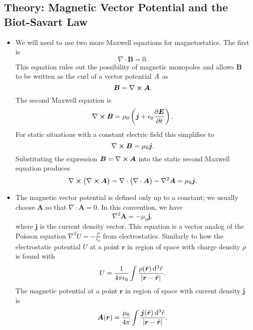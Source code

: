 \documentclass[11pt, a4paper]{article}
\newcommand{\diff}{\mathop{}\!\mathrm{d}} %
\renewcommand{\vec}[1]{\bm{#1}} %
\newcommand{\tvec}[1]{\tilde{\vec{#1}}} %
\renewcommand{\r}{\vec{r}}
\newcommand{\E}{\vec{E}}  %
\newcommand{\B}{\vec{B}}  %
\newcommand{\A}{\vec{A}}  %
\newcommand{\ee}{\epsilon_{0}}  %
\renewcommand{\div}{\nabla \cdot}
\renewcommand{\curl}{\nabla \cross}
\renewcommand{\laplacian}{\nabla^{2}}
\begin{document}
\subsection{Theory: Magnetic Vector Potential and the Biot-Savart Law}
\begin{itemize}
	\item We will need to use two more Maxwell equations for magnetostatics. The first is
	\begin{equation*}
		\div \B = 0.
	\end{equation*}
	This equation rules out the possibility of magnetic monopoles and allows $ \B $ to be written as the curl of a vector potential $ \\A $ as
	\begin{equation*}
		\B = \curl \A.
	\end{equation*}
	The second Maxwell equation is 
	\begin{equation*}
		\curl \B = \mu_{0}\left(\vec{j} + \ee \pdv{\E}{t}\right).
	\end{equation*}
	For static situations with a constant electric field this simplifies to
	\begin{equation*}
		\curl \B = \mu_{0}\vec{j}.
	\end{equation*}
	Substituting the expression $ \B = \curl \A $ into the static second Maxwell equation produces
	\begin{equation*}
		\curl \big(\curl \A\big) = \div \big(\div \A\big) - \laplacian \A = \mu_{0} \vec{j}.
	\end{equation*}
	
	\item The magnetic vector potential is defined only up to a constant; we usually choose $ \A $ so that $ \div \A = 0 $. In this convention, we have
	\begin{equation*}
		\laplacian \A = - \mu_{0}\vec{j},
	\end{equation*}
	where $ \vec{j} $ is the current density vector. This equation is a vector analog of the Poisson equation $ \laplacian U = - \frac{\rho}{\ee} $ from electrostatics. Similarly to how the electrostatic potential $ U $ at a point $ \r $ in region of space with charge density $ \rho $ is found with
	\begin{equation*}
		U = \frac{1}{4 \pi \ee} \int \frac{\rho(\tvec{r})\diff^{3}\tilde{r}}{\abs{\r - \tvec{r}}}.
	\end{equation*}
	The magnetic potential at a point $ \r $ in region of space with current density $ \vec{j} $ is
	\begin{equation*}
		\A(\r) = \frac{\mu_{0}}{4 \pi} \int \frac{\vec{j}(\tvec{r})\diff^{3}\tilde{r}}{\abs{\r - \tvec{r}}}.
	\end{equation*}
	

\end{itemize}
\end{document}
